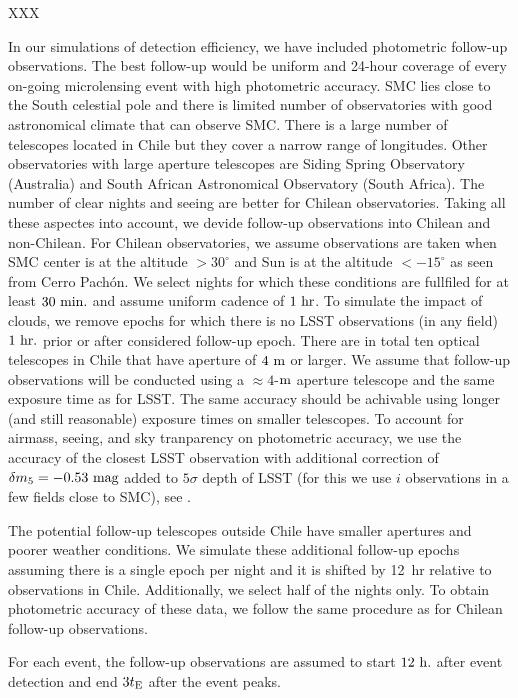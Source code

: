 \documentclass[12pt,letterpaper]{article}
\begin{document}
XXX

In our simulations of detection efficiency, we have included photometric follow-up observations.  
The best follow-up would be uniform and 24-hour coverage of 
every on-going microlensing event with high photometric accuracy. 
SMC lies close to the South celestial pole and there is limited number of 
observatories with good astronomical climate that can observe SMC.  
There is a large number of telescopes located in Chile but they cover a narrow 
range of longitudes.  Other observatories with large aperture telescopes are 
Siding Spring Observatory (Australia) and 
South African Astronomical Observatory (South Africa).  
The number of clear nights and seeing are better for Chilean observatories.  
Taking all these aspectes into account, we devide follow-up observations 
into Chilean and non-Chilean.  
For Chilean observatories, we assume observations are taken when SMC center 
is at the altitude $>30^{\circ}$ and Sun is at the altitude $<-15^{\circ}$ 
as seen from Cerro Pach\'{o}n.  We select nights for which these conditions 
are fullfiled for at least $30~{\rm min.}$ and assume uniform cadence of 
$1~{\rm hr}$.  To simulate the impact of clouds, we remove epochs for which 
there is no LSST observations (in any field) $1~{\rm hr.}$ prior or after 
considered follow-up epoch.  There are in total ten optical telescopes 
in Chile that have aperture of $4~{\rm m}$ or larger.  
We assume that follow-up observations will be conducted 
using a $\approx4$-${\rm m}$ aperture telescope and the same exposure time as for LSST.  
The same accuracy should be achivable using longer (and still reasonable) 
exposure times on smaller telescopes.  To account for airmass, seeing, and 
sky tranparency on photometric accuracy, we use the accuracy of the closest LSST observation 
with additional correction of $\delta m_5 = -0.53~{\rm mag}$ added to $5\sigma$ depth of LSST 
(for this we use $i$ observations in a few fields close to SMC), see \citet{ivezic18}. 

The potential follow-up telescopes outside Chile have smaller apertures and 
poorer weather conditions.  We simulate these additional follow-up epochs 
assuming there is a single epoch per night and it is shifted by 12~hr 
relative to observations in Chile.  Additionally, we select half of 
the nights only.  To obtain photometric accuracy of these data, we follow 
the same procedure as for Chilean follow-up observations.

For each event, the follow-up observations are assumed to start $12~{\rm h.}$ 
after event detection and end $3t_{\rm E}$ after the event peaks.
\end{document}
